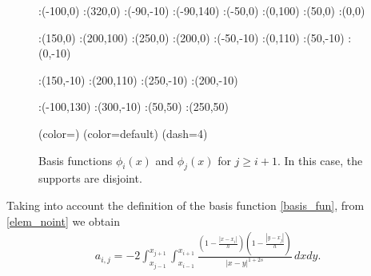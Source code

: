 \begin{figure}[h]
\figinit{0.8pt}
:(-100,0) :(320,0)
:(-90,-10) :(-90,140)
:(-50,0) :(0,100) 
:(50,0) :(0,0)

:(150,0) :(200,100) 
:(250,0) :(200,0)
%
:(-50,-10) :(0,110) 
:(50,-10) :(0,-10)

:(150,-10) :(200,110) 
:(250,-10) :(200,-10)

:(-100,130) :(300,-10)
:(50,50) :(250,50)

\figdrawbegin{}
\figdrawarrow[1,2]
\figdrawline[3,4]
\figdrawline[4,5]
\figset (color=\Redrgb)
\figdrawline[31,41]
\figdrawline[41,51]
\figset (color=default)
\figset(dash=4)
\figdrawline[4,6]
\figdrawline[41,61]
\figdrawarrow[11,12]

\figdrawend

\centerline{\box\figBoxA}
\caption{Basis functions $\phi_i(x)$ and $\phi_j(x)$ for $j\geq i+1$. In this case, the supports are disjoint.}\label{basis_upp_tri}
\end{figure}

Taking into account the definition of the basis function \eqref{basis_fun}, from \eqref{elem_noint} we obtain
\begin{align*}
	a_{i,j}=-2 \int_{x_{j-1}}^{x_{j+1}}\int_{x_{i-1}}^{x_{i+1}}\frac{\left(1-\frac{|x-x_i|}{h}\right)\left(1-\frac{|y-x_j|}{h}\right)}{|x-y|^{1+2s}}\,dxdy.
\end{align*}

